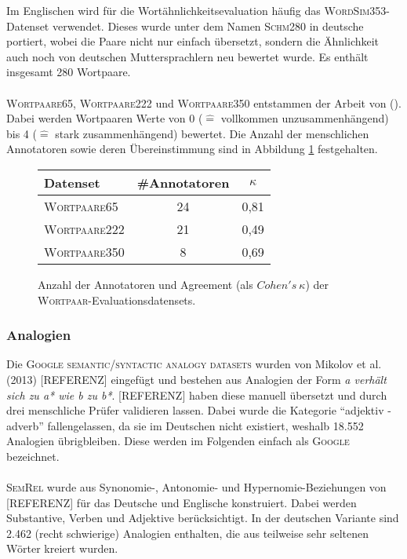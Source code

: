     Im Englischen wird für die Wortähnlichkeitsevaluation häufig das \textsc{WordSim353}-Datenset verwendet. Dieses
    wurde unter dem Namen \textsc{Schm280} in deutsche portiert, wobei die Paare nicht nur einfach übersetzt, sondern die
    Ähnlichkeit auch noch von deutschen Muttersprachlern neu bewertet wurde. Es enthält insgesamt 280 Wortpaare.\\ \\
    \textsc{Wortpaare65}, \textsc{Wortpaare222} und \textsc{Wortpaare350} entstammen der Arbeit von (\cite{rubenstein1965contextual}). Dabei werden Wortpaaren
    Werte von 0 ($\hat{=}$ vollkommen unzusammenhängend) bis 4 ($\hat{=}$ stark zusammenhängend) bewertet. Die Anzahl
    der menschlichen Annotatoren sowie deren Übereinstimmung sind in Abbildung \ref{fig:evalsets} festgehalten.

    \begin{figure}[h]
      \centering
      \begin{tabular}{l|cc}
        Datenset & \#Annotatoren & $\kappa$ \\
        \hline
        \textsc{Wortpaare65} & 24 & 0,81 \\
        \textsc{Wortpaare222} & 21 & 0,49 \\
        \textsc{Wortpaare350} & 8 & 0,69 \\
      \end{tabular}
      \caption{Anzahl der Annotatoren und Agreement (als $Cohen's\ \kappa$) der \textsc{Wortpaar}-Evaluationsdatensets.
      \label{fig:evalsets}}
    \end{figure}

    \subsubsection{Analogien}

    Die \textsc{Google semantic/syntactic analogy datasets} wurden von Mikolov et al. (2013) [REFERENZ] eingefügt und bestehen
    aus Analogien der Form \emph{a verhält sich zu a* wie b zu b*}. [REFERENZ] haben diese manuell übersetzt und durch
    drei menschliche Prüfer validieren lassen. Dabei wurde die Kategorie ``adjektiv - adverb'' fallengelassen, da sie
    im Deutschen nicht existiert, weshalb 18.552 Analogien übrigbleiben. Diese werden im Folgenden einfach als
    \textsc{Google} bezeichnet.\\ \\
    \textsc{SemRel} wurde aus Synonomie-, Antonomie- und Hypernomie-Beziehungen von [REFERENZ] für das Deutsche und Englische
    konstruiert. Dabei werden Substantive, Verben und Adjektive berücksichtigt. In der deutschen Variante sind 2.462 (recht schwierige) Analogien enthalten,
    die aus teilweise sehr seltenen Wörter kreiert wurden.


